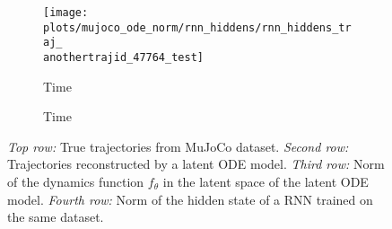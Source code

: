 \documentclass{article}
\begin{document}
\begin{figure*}[b]
\begin{subfigure}[b]{0.93\linewidth}
\texttt{[image: plots/mujoco\_ode\_norm/rnn\_hiddens/rnn\_hiddens\_traj\_\\anothertrajid\_47764\_test]}
	\end{subfigure}
\begin{subfigure}[b]{0.05\linewidth}
	\hfill
\end{subfigure}
\begin{subfigure}[b]{0.465\linewidth}
		\centering
		\hspace{3mm}
		\small Time
	\end{subfigure}
	\begin{subfigure}[b]{0.465\linewidth}
		\centering
		\hspace{3mm}
		\small Time
	\end{subfigure}
\caption{\emph{Top row:} True trajectories from MuJoCo dataset.
	\emph{Second row:} Trajectories reconstructed by a latent ODE model.
	\emph{Third row:} Norm of the dynamics function $f_\theta$ in the latent space of the latent ODE model.
	\emph{Fourth row:} Norm of the hidden state of a RNN trained on the same dataset.
	}
	\vspace{-3mm}
\label{fig:mujoco}
\end{figure*}
\end{document}
